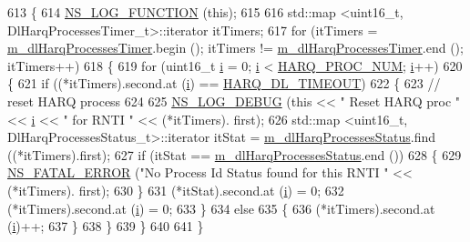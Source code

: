 \begin{DoxyCode}
613 \{
614   \hyperlink{log-macros-disabled_8h_a90b90d5bad1f39cb1b64923ea94c0761}{NS\_LOG\_FUNCTION} (\textcolor{keyword}{this});
615 
616   std::map <uint16\_t, DlHarqProcessesTimer\_t>::iterator itTimers;
617   \textcolor{keywordflow}{for} (itTimers = \hyperlink{classns3_1_1FdBetFfMacScheduler_a78314b001be9986429ecb13daac0885a}{m\_dlHarqProcessesTimer}.begin (); itTimers != 
      \hyperlink{classns3_1_1FdBetFfMacScheduler_a78314b001be9986429ecb13daac0885a}{m\_dlHarqProcessesTimer}.end (); itTimers++)
618     \{
619       \textcolor{keywordflow}{for} (uint16\_t \hyperlink{bernuolliDistribution_8m_a6f6ccfcf58b31cb6412107d9d5281426}{i} = 0; \hyperlink{bernuolliDistribution_8m_a6f6ccfcf58b31cb6412107d9d5281426}{i} < \hyperlink{cqa-ff-mac-scheduler_8h_a9185d8d7d2b2979181d4a7044a3d3555}{HARQ\_PROC\_NUM}; \hyperlink{bernuolliDistribution_8m_a6f6ccfcf58b31cb6412107d9d5281426}{i}++)
620         \{
621           \textcolor{keywordflow}{if} ((*itTimers).second.at (\hyperlink{bernuolliDistribution_8m_a6f6ccfcf58b31cb6412107d9d5281426}{i}) == \hyperlink{cqa-ff-mac-scheduler_8h_add9e0c4889dc1b5b25686480b31ad166}{HARQ\_DL\_TIMEOUT})
622             \{
623               \textcolor{comment}{// reset HARQ process}
624 
625               \hyperlink{group__logging_ga413f1886406d49f59a6a0a89b77b4d0a}{NS\_LOG\_DEBUG} (\textcolor{keyword}{this} << \textcolor{stringliteral}{" Reset HARQ proc "} << \hyperlink{bernuolliDistribution_8m_a6f6ccfcf58b31cb6412107d9d5281426}{i} << \textcolor{stringliteral}{" for RNTI "} << (*itTimers).
      first);
626               std::map <uint16\_t, DlHarqProcessesStatus\_t>::iterator itStat = 
      \hyperlink{classns3_1_1FdBetFfMacScheduler_a93d8bf3298e9b289d9fcf70571b27b78}{m\_dlHarqProcessesStatus}.find ((*itTimers).first);
627               \textcolor{keywordflow}{if} (itStat == \hyperlink{classns3_1_1FdBetFfMacScheduler_a93d8bf3298e9b289d9fcf70571b27b78}{m\_dlHarqProcessesStatus}.end ())
628                 \{
629                   \hyperlink{group__fatal_ga5131d5e3f75d7d4cbfd706ac456fdc85}{NS\_FATAL\_ERROR} (\textcolor{stringliteral}{"No Process Id Status found for this RNTI "} << (*itTimers).
      first);
630                 \}
631               (*itStat).second.at (\hyperlink{bernuolliDistribution_8m_a6f6ccfcf58b31cb6412107d9d5281426}{i}) = 0;
632               (*itTimers).second.at (\hyperlink{bernuolliDistribution_8m_a6f6ccfcf58b31cb6412107d9d5281426}{i}) = 0;
633             \}
634           \textcolor{keywordflow}{else}
635             \{
636               (*itTimers).second.at (\hyperlink{bernuolliDistribution_8m_a6f6ccfcf58b31cb6412107d9d5281426}{i})++;
637             \}
638         \}
639     \}
640 
641 \}
\end{DoxyCode}


